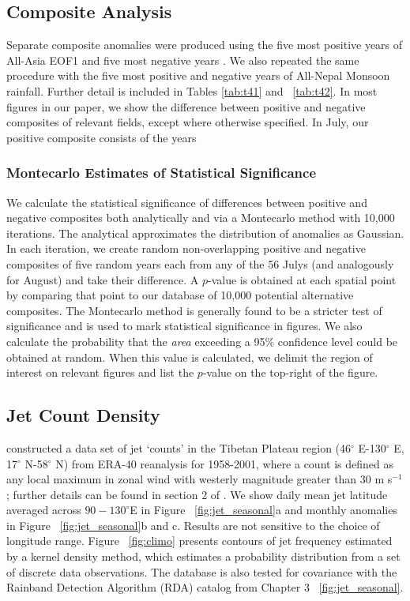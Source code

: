 \subsection{Composite Analysis}		
	
	Separate composite anomalies were produced using the five most positive years of All-Asia EOF1 and five most negative years \citep{Day2015}. We also repeated the same procedure with the five most positive and negative years of All-Nepal Monsoon rainfall. Further detail is included in Tables \ref{tab:t41} and ~\ref{tab:t42}. In most figures in our paper, we show the difference between positive and negative composites of relevant fields, except where otherwise specified. In July, our positive composite consists of the years
	
\subsubsection{Montecarlo Estimates of Statistical Significance}	
	
	We calculate the statistical significance of differences between positive and negative composites both analytically and via a Montecarlo method with 10,000 iterations. The analytical approximates the distribution of anomalies as Gaussian. In each iteration, we create random non-overlapping positive and negative composites of five random years each from any of the 56 Julys (and analogously for August) and take their difference. A $p$-value is obtained at each spatial point by comparing that point to our database of 10,000 potential alternative composites. The Montecarlo method is generally found to be a stricter test of significance and is used to mark statistical significance in figures. We also calculate the probability that the \textit{area} exceeding a 95\% confidence level could be obtained at random. When this value is calculated, we delimit the region of interest on relevant figures and list the $p$-value on the top-right of the figure.

\subsection{Jet Count Density} 

	\citet{Schiemann2009} constructed a data set of jet `counts' in the Tibetan Plateau region (46$^{\circ}$ E-130$^{\circ}$ E, 17$^{\circ}$ N-58$^{\circ}$ N) from ERA-40 reanalysis for 1958-2001, where a count is defined as any local maximum in zonal wind with westerly magnitude greater than $30$ m s$^{-1}$; further details can be found in section 2 of \citet{Schiemann2009}. We show daily mean jet latitude averaged across $90-130^\circ$E in Figure ~\ref{fig:jet_seasonal}a and monthly anomalies in Figure ~\ref{fig:jet_seasonal}b and c. Results are not sensitive to the choice of longitude range. Figure ~\ref{fig:climo} presents contours of jet frequency estimated by a kernel density method, which estimates a probability distribution from a set of discrete data observations. The \citet{Schiemann2009} database is also tested for covariance with the Rainband Detection Algorithm (RDA) catalog from Chapter 3 ~\ref{fig:jet_seasonal}.
	
